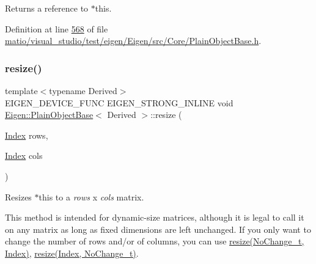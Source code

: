 \begin{DoxyReturn}{Returns}
a reference to $\ast$this. 
\end{DoxyReturn}


Definition at line \hyperlink{matio_2visual__studio_2test_2eigen_2_eigen_2src_2_core_2_plain_object_base_8h_source_l00568}{568} of file \hyperlink{matio_2visual__studio_2test_2eigen_2_eigen_2src_2_core_2_plain_object_base_8h_source}{matio/visual\+\_\+studio/test/eigen/\+Eigen/src/\+Core/\+Plain\+Object\+Base.\+h}.

\mbox{\label{class_eigen_1_1_plain_object_base_a99d9054ee2d5a40c6e00ded0265e9cea}} 
\subsubsection{\texorpdfstring{resize()}{resize()}\hspace{0.1cm}{\footnotesize\ttfamily [1/8]}}
{\footnotesize\ttfamily template$<$typename Derived$>$ \\
E\+I\+G\+E\+N\+\_\+\+D\+E\+V\+I\+C\+E\+\_\+\+F\+U\+NC E\+I\+G\+E\+N\+\_\+\+S\+T\+R\+O\+N\+G\+\_\+\+I\+N\+L\+I\+NE void \hyperlink{class_eigen_1_1_plain_object_base}{Eigen\+::\+Plain\+Object\+Base}$<$ Derived $>$\+::resize (\begin{DoxyParamCaption}\item[{\hyperlink{namespace_eigen_a62e77e0933482dafde8fe197d9a2cfde}{Index}}]{rows,  }\item[{\hyperlink{namespace_eigen_a62e77e0933482dafde8fe197d9a2cfde}{Index}}]{cols }\end{DoxyParamCaption})\hspace{0.3cm}{\ttfamily [inline]}}

Resizes {\ttfamily $\ast$this} to a {\itshape rows} x {\itshape cols} matrix.

This method is intended for dynamic-\/size matrices, although it is legal to call it on any matrix as long as fixed dimensions are left unchanged. If you only want to change the number of rows and/or of columns, you can use \hyperlink{class_eigen_1_1_plain_object_base_ab71a655f73d05a0e389e3ed13b6fe5f3}{resize(\+No\+Change\+\_\+t, Index)}, \hyperlink{class_eigen_1_1_plain_object_base_a7b44761b7350ae3756035bbf7d7c04f6}{resize(\+Index, No\+Change\+\_\+t)}.

